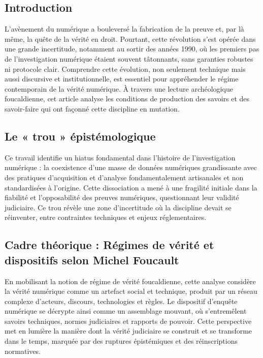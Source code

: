 \documentclass[12pt, a4paper]{article}
\begin{document}
\begin{enumerate}[label=\textbf{\arabic*.}, start=6]
		\subsection*{Introduction}
		
		L'avènement du numérique a bouleversé la fabrication de la preuve et, par là même, la quête de la vérité en droit. Pourtant, cette révolution s'est opérée dans une grande incertitude, notamment au sortir des années 1990, où les premiers pas de l'investigation numérique étaient souvent tâtonnants, sans garanties robustes ni protocole clair. Comprendre cette évolution, non seulement technique mais aussi discursive et institutionnelle, est essentiel pour appréhender le régime contemporain de la vérité numérique. À travers une lecture archéologique foucaldienne, cet article analyse les conditions de production des savoirs et des savoir-faire qui ont façonné cette discipline en mutation.
		
		\subsection*{Le « trou » épistémologique}
		
		Ce travail identifie un hiatus fondamental dans l'histoire de l'investigation numérique : la coexistence d'une masse de données numériques grandissante avec des pratiques d'acquisition et d'analyse fondamentalement artisanales et non standardisées à l'origine. Cette dissociation a mené à une fragilité initiale dans la fiabilité et l'opposabilité des preuves numériques, questionnant leur validité judiciaire. Ce trou révèle une zone d'incertitude où la discipline devait se réinventer, entre contraintes techniques et enjeux réglementaires.
		
		\subsection*{Cadre théorique : Régimes de vérité et dispositifs selon Michel Foucault}
		
		En mobilisant la notion de régime de vérité foucaldienne, cette analyse considère la vérité numérique comme un artefact social et technique, produit par un réseau complexe d'acteurs, discours, technologies et règles. Le dispositif d'enquête numérique se décrypte ainsi comme un assemblage mouvant, où s'entremêlent savoirs techniques, normes judiciaires et rapports de pouvoir. Cette perspective met en lumière la manière dont la vérité judiciaire se construit et se transforme dans le temps, marquée par des ruptures épistémiques et des réinscriptions normatives.
		

\end{enumerate}
\end{document}
